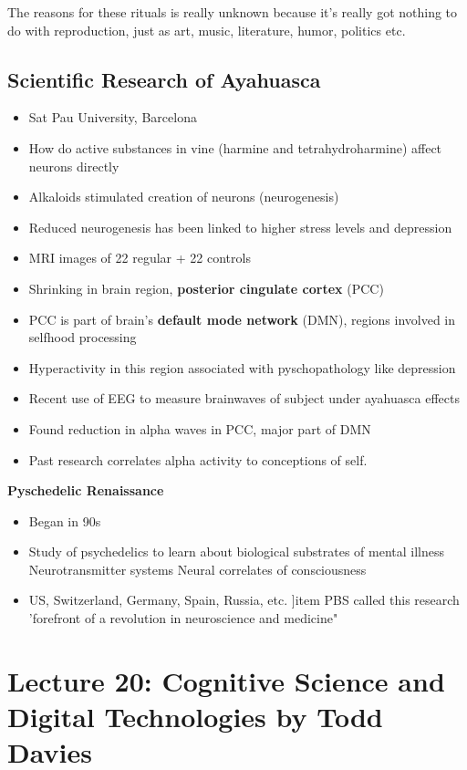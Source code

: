 \documentclass{article}
\begin{document}
The reasons for these rituals is really unknown because it's really got nothing to do with reproduction, just as art, music, literature, humor, politics etc. \\

\subsection{Scientific Research of Ayahuasca}
\begin{itemize}
    \item Sat Pau University, Barcelona
    \item How do active substances in vine (harmine and tetrahydroharmine) affect neurons directly
    \item Alkaloids stimulated creation of neurons (neurogenesis)
    \item Reduced neurogenesis has been linked to higher stress levels and depression
    \item MRI images of 22 regular + 22 controls
    \item Shrinking in brain region, \textbf{posterior cingulate cortex} (PCC) 
    \item PCC is part of brain's \textbf{default mode network} (DMN), regions involved in selfhood processing
    \item Hyperactivity in this region associated with pyschopathology like depression
    \item Recent use of EEG to measure brainwaves of subject under ayahuasca effects
    \item Found reduction in alpha waves in PCC, major part of DMN
    \item Past research correlates alpha activity to conceptions of self. 
\end{itemize}

\noindent \textbf{Pyschedelic Renaissance}
\begin{itemize}
    \item Began in 90s
    \item Study of psychedelics to learn about
        \subitem biological substrates of mental illness
        \subitem Neurotransmitter systems
        \subitem Neural correlates of consciousness
    \item US, Switzerland, Germany, Spain, Russia, etc. 
    ]item PBS called this research 'forefront of a revolution in neuroscience and medicine"
\end{itemize}

\section{Lecture 20: Cognitive Science and Digital Technologies by Todd Davies}
\end{document}
